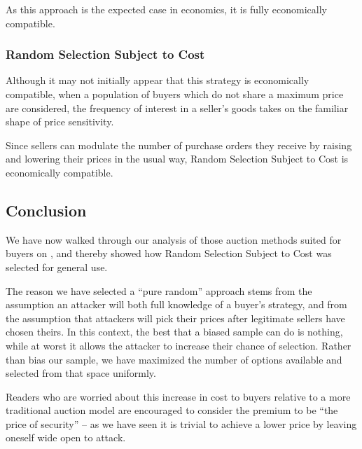 As this approach is the expected case in economics, it is fully
economically compatible.

\subsubsection*{Random Selection Subject to Cost}

Although it may not initially appear that this strategy is
economically compatible, when a population of buyers which do not
share a maximum price are considered, the frequency of interest in a
seller's goods takes on the familiar shape of price sensitivity.


Since sellers can modulate the number of purchase orders they receive
by raising and lowering their prices in the usual way, Random
Selection Subject to Cost is economically compatible.

\subsection{Conclusion}

We have now walked through our analysis of those auction methods
suited for buyers on \tOM{}, and thereby showed how Random Selection
Subject to Cost was selected for general use.

The reason we have selected a ``pure random'' approach stems from the
assumption an attacker will both full knowledge of a buyer's strategy,
and from the assumption that attackers will pick their prices after
legitimate sellers have chosen theirs.  In this context, the best that
a biased sample can do is nothing, while at worst it allows the
attacker to increase their chance of selection. Rather than bias our
sample, we have maximized the number of options available and selected
from that space uniformly.

Readers who are worried about this increase in cost to buyers relative
to a more traditional auction model are encouraged to consider the
premium to be ``the price of security'' -- as we have seen it is
trivial to achieve a lower price by leaving oneself wide open to
attack.
